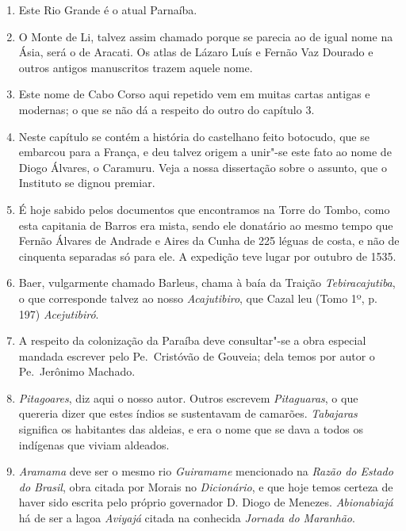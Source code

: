 \begin{enumerate}
\item Este Rio Grande é o atual Parnaíba.

\item O Monte de Li, talvez assim chamado porque se parecia ao de igual nome na Ásia, 
será o de Aracati. Os atlas de Lázaro Luís e Fernão Vaz Dourado e outros antigos 
manuscritos trazem aquele nome.

\item Este nome de Cabo Corso aqui repetido vem em muitas cartas antigas e modernas; o 
que se não dá a respeito do outro do capítulo 3.

\item Neste capítulo se contém a história do castelhano feito botocudo, que se embarcou 
para a França, e deu talvez origem a unir"-se este fato ao nome de Diogo Álvares, o 
Caramuru. Veja a nossa dissertação sobre o assunto, que o Instituto se dignou premiar.

\item  É hoje sabido pelos documentos que encontramos na Torre do
Tombo, como esta capitania de Barros era mista, sendo ele donatário ao
mesmo tempo que Fernão Álvares de Andrade e Aires da Cunha de 225
léguas de costa, e não de cinquenta separadas só para ele. A expedição teve
lugar por outubro de 1535.

\item  Baer, vulgarmente chamado Barleus, chama à baía da Traição \textit{Tebiracajutiba}, 
o que corresponde talvez ao nosso \textit{Acajutibiro}, que Cazal leu
(Tomo 1º, p. 197) \textit{Acejutibiró}.

\item A respeito da colonização da Paraíba deve consultar"-se a obra especial mandada 
escrever pelo Pe.~Cristóvão de Gouveia; dela temos por autor o  Pe.~Jerônimo 
Machado.

\item \textit{Pitagoares}, diz aqui o nosso autor. Outros escrevem \textit{Pitaguaras}, o que quereria 
dizer que estes índios se sustentavam de camarões. \textit{Tabajaras} significa os habitantes das 
aldeias, e era o nome que se dava a todos os indígenas que viviam aldeados.

\item \textit{Aramama} deve ser o mesmo rio \textit{Guiramame} mencionado na \textit{Razão do Estado do Brasil}, 
obra citada por Morais no \textit{Dicionário}, e que hoje temos certeza de haver sido escrita pelo 
próprio governador D. Diogo de Menezes. \textit{Abionabiajá} há de ser a lagoa \textit{Aviyajá} citada na conhecida \textit{Jornada do Maranhão}.


\end{enumerate}
